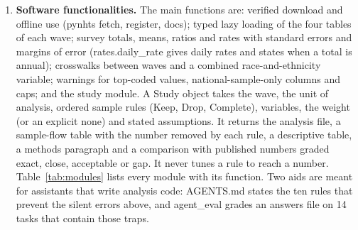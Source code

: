 \documentclass[preprint,12pt, a4paper]{elsarticle}
\begin{document}
\begin{enumerate}
\begin{enumerate}
pynhts.concepts and pynhts.harmonize describe 44 concepts across the four waves, each graded as comparable, comparable with care, or not comparable, and provide 19 crosswalks (trip purpose, mode, race and Hispanic origin, medical condition, and others). A crosswalk reads the wave from the frame and refuses a mismatch; each category is marked exact, approximate or nested, with the evidence in the data. The analysis layer contains aggregate (trips to persons or households with an explicit missing-value policy and true zeros), features (93 documented variables with lineage), study (below), trends (per-wave estimates; pooling is refused for non-comparable concepts), transform (splits by household so that train and test sets do not share a household) and tables and viz for reporting. pynhts.recipes encodes the numbers printed in official reports together with the expected status of each, and a generated report lists every gap. A small bridge exports tables to NumPy arrays, PyTorch tensors and household graphs.

\item \textbf{Software functionalities.} The main functions are: verified download and offline use (pynhts fetch, register, docs); typed lazy loading of the four tables of each wave; survey totals, means, ratios and rates with standard errors and margins of error (rates.daily\_rate gives daily rates and states when a total is annual); crosswalks between waves and a combined race-and-ethnicity variable; warnings for top-coded values, national-sample-only columns and caps; and the study module. A Study object takes the wave, the unit of analysis, ordered sample rules (Keep, Drop, Complete), variables, the weight (or an explicit none) and stated assumptions. It returns the analysis file, a sample-flow table with the number removed by each rule, a descriptive table, a methods paragraph and a comparison with published numbers graded exact, close, acceptable or gap. It never tunes a rule to reach a number. Table~\ref{tab:modules} lists every module with its function. Two aids are meant for assistants that write analysis code: AGENTS.md states the ten rules that prevent the silent errors above, and agent\_eval grades an answers file on 14 tasks that contain those traps.


\end{enumerate}
\end{enumerate}
\end{document}
